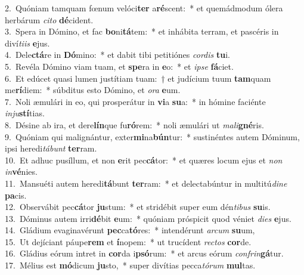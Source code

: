 {2.~}Quóniam tamquam fœnum velóci\textbf{ter} a\textbf{ré}scent:~* et quemádmodum ólera herbárum \textit{ci}\textit{to} \textbf{dé}cident.\\
{3.~}Spera in Dómino, et fac \textbf{bo}ni\textbf{tá}tem:~* et inhábita terram, et pascéris in diví\textit{ti}\textit{is} \textbf{e}jus.\\
{4.~}Dele\textbf{ctá}re in \textbf{Dó}mino:~* et dabit tibi petitiónes \textit{cor}\textit{dis} \textbf{tu}i.\\
{5.~}Revéla Dómino viam tuam, et \textbf{spe}ra in \textbf{e}o:~* et \textit{i}\textit{pse} \textbf{fá}ciet.\\
{6.~}Et edúcet quasi lumen justítiam tuam:~† et judícium tuum \textbf{tam}quam me\textbf{rí}diem:~* súbditus esto Dómino, et \textit{o}\textit{ra} \textbf{e}um.\\
{7.~}Noli æmulári in eo, qui prosperátur in \textbf{vi}a \textbf{su}a:~* in hómine faciénte \textit{in}\textit{ju}\textbf{stí}tias.\\
{8.~}Désine ab ira, et dere\textbf{lín}que fu\textbf{ró}rem:~* noli æmulári ut \textit{ma}\textit{li}\textbf{gné}ris.\\
{9.~}Quóniam qui malignántur, exter\textbf{mi}na\textbf{bún}tur:~* sustinéntes autem Dóminum, ipsi heredi\textit{tá}\textit{bunt} \textbf{ter}ram.\\
{10.~}Et adhuc pusíllum, et non \textbf{e}rit pec\textbf{cá}tor:~* et quæres locum ejus et \textit{non} \textit{in}\textbf{vé}nies.\\
{11.~}Mansuéti autem heredi\textbf{tá}bunt \textbf{ter}ram:~* et delectabúntur in multitú\textit{di}\textit{ne} \textbf{pa}cis.\\
{12.~}Observábit pec\textbf{cá}tor \textbf{ju}stum:~* et stridébit super eum dén\textit{ti}\textit{bus} \textbf{su}is.\\
{13.~}Dóminus autem irri\textbf{dé}bit \textbf{e}um:~* quóniam próspicit quod véniet \textit{di}\textit{es} \textbf{e}jus.\\
{14.~}Gládium evaginavérunt \textbf{pec}ca\textbf{tó}res:~* intendérunt \textit{ar}\textit{cum} \textbf{su}um,\\
{15.~}Ut dejíciant páupe\textbf{rem} et \textbf{í}nopem:~* ut trucídent \textit{re}\textit{ctos} \textbf{cor}de.\\
{16.~}Gládius eórum intret in \textbf{cor}da i\textbf{psó}rum:~* et arcus eórum \textit{con}\textit{frin}\textbf{gá}tur.\\
{17.~}Mélius est \textbf{mó}dicum \textbf{ju}sto,~* super divítias pecca\textit{tó}\textit{rum} \textbf{mul}tas.\\
